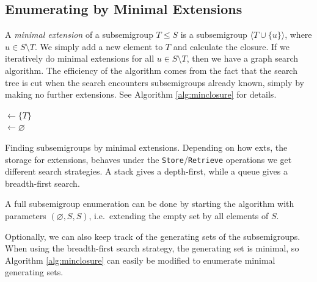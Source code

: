 \documentclass{amsart}
\theoremstyle{plain}
\theoremstyle{definition}
\begin{document}
\subsection{Enumerating by Minimal Extensions}
\label{sec:minext}
A \emph{minimal extension} of a subsemigroup $T\leq S$ is a subsemigroup $\langle T\cup\{u\}\rangle$, where $u\in S\setminus T$.
We simply add a new element to $T$ and calculate the closure.
If we iteratively do minimal extensions for all $u\in S\setminus T$, then we have a graph search algorithm.
The efficiency of the algorithm  comes from the fact that the search tree is cut when the search encounters subsemigroups already known, simply by making no further extensions. See Algorithm \ref{alg:minclosure} for details.
\begin{algorithm}[t]
\BlankLine
\Name{}
\subs $\leftarrow \{T\}$\\
\exts $\leftarrow \varnothing$\\
\Return \subs
\caption{Finding subsemigroups by minimal extensions. Depending on how \textsf{exts}, the storage for extensions, behaves under the \texttt{Store}/\texttt{Retrieve} operations we get different search strategies. A stack gives a depth-first, while a queue gives a breadth-first search.}
\label{alg:minclosure}
\end{algorithm}
A full subsemigroup enumeration can be done by starting the algorithm with parameters $(\varnothing,S,S)$, i.e.\ extending the empty set by all elements of $S$.

Optionally, we can also keep track of the generating sets of the subsemigroups.
When using the breadth-first search strategy, the generating set is minimal, so Algorithm \ref{alg:minclosure} can easily be modified to enumerate minimal generating sets.
\end{document}

